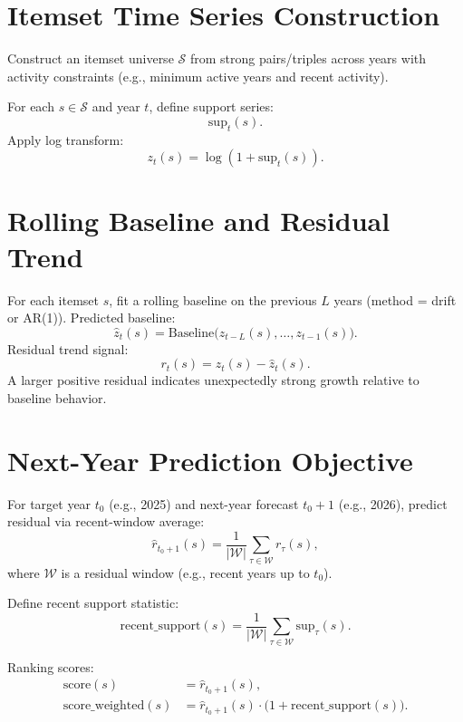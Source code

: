\documentclass[11pt]{article}
\begin{document}
\section{Itemset Time Series Construction}
Construct an itemset universe $\mathcal{S}$ from strong pairs/triples across years with activity constraints (e.g., minimum active years and recent activity).

For each $s\in\mathcal{S}$ and year $t$, define support series:
\begin{equation}
\mathrm{sup}_t(s).
\end{equation}
Apply log transform:
\begin{equation}
z_t(s)=\log(1+\mathrm{sup}_t(s)).
\end{equation}

\section{Rolling Baseline and Residual Trend}
For each itemset $s$, fit a rolling baseline on the previous $L$ years (method = drift or AR(1)).
Predicted baseline:
\begin{equation}
\widehat{z}_t(s)=\text{Baseline}\big(z_{t-L}(s),\dots,z_{t-1}(s)\big).
\end{equation}
Residual trend signal:
\begin{equation}
r_t(s)=z_t(s)-\widehat{z}_t(s).
\end{equation}
A larger positive residual indicates unexpectedly strong growth relative to baseline behavior.

\section{Next-Year Prediction Objective}
For target year $t_0$ (e.g., 2025) and next-year forecast $t_0+1$ (e.g., 2026), predict residual via recent-window average:
\begin{equation}
\widehat{r}_{t_0+1}(s)=\frac{1}{|\mathcal{W}|}\sum_{\tau\in\mathcal{W}} r_{\tau}(s),
\end{equation}
where $\mathcal{W}$ is a residual window (e.g., recent years up to $t_0$).

Define recent support statistic:
\begin{equation}
\mathrm{recent\_support}(s)=\frac{1}{|\mathcal{W}|}\sum_{\tau\in\mathcal{W}}\mathrm{sup}_{\tau}(s).
\end{equation}

Ranking scores:
\begin{align}
\mathrm{score}(s) &= \widehat{r}_{t_0+1}(s),\\
\mathrm{score\_weighted}(s) &= \widehat{r}_{t_0+1}(s)\cdot\big(1+\mathrm{recent\_support}(s)\big).
\end{align}
\end{document}
